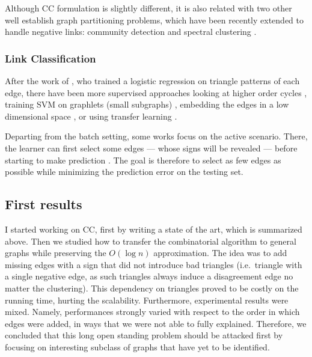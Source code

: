Although CC formulation is slightly different, it is also related with two
other well establish graph partitioning problems, which have been recently
extended to handle negative links: community detection
\autocites{Yang2007}{Traag2009}{Amelio2013}{Chen14} and spectral clustering
\autocites{Luca10}{Gallier15}.

\subsubsection{Link Classification}\label{link-classification}

After the work of \textcite{Leskovec2010}, who trained a logistic regression on
triangle patterns of each edge, there have been more supervised approaches
looking at higher order cycles \autocite{LowRankCompletion14}, training SVM on
graphlets (small subgraphs) \autocite{Papaoikonomou2014}, embedding the edges
in a low dimensional space \autocite{Qian2014}, or using transfer learning
\autocite{SNTransfer13}.

Departing from the batch setting, some works focus on the active scenario.
There, the learner can first select some edges --- whose signs will be revealed
--- before starting to make prediction \autocites{Cesa-Bianchi2012a}%
{Cesa-Bianchi2013}. The goal is therefore to select as few edges as possible
while minimizing the prediction error on the testing set.

\subsection{First results}\label{first-results}

I started working on CC, first by writing a state of the art, which is
summarized above. Then we studied how to transfer the combinatorial algorithm
\kwik{} to general graphs while preserving the $O(\log n)$ approximation. The
idea was to add missing edges with a sign that did not introduce bad triangles
(i.e.~triangle with a single negative edge, as such triangles always induce a
disagreement edge no matter the clustering). This dependency on triangles
proved to be costly on the running time, hurting the scalability. Furthermore,
experimental results were mixed. Namely, performances strongly varied with
respect to the order in which edges were added, in ways that we were not able
to fully explained. Therefore, we concluded that this long open standing
problem should be attacked first by focusing on interesting subclass of graphs
that have yet to be identified.

